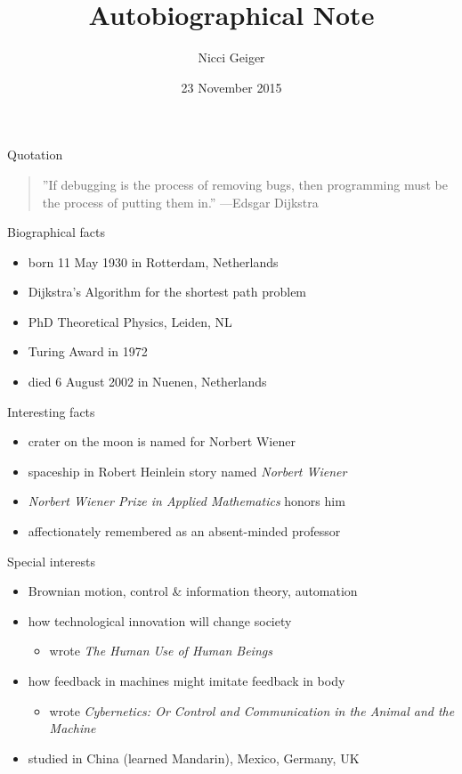 \documentclass{beamer}
\title{Autobiographical Note}
\author{Nicci Geiger}
\institute{Cornell College}
\date{23 November 2015}
\begin{document}
\begin{frame}
  \titlepage
\end{frame}

\begin{frame}{Quotation}
\begin{quotation}
\noindent
''If debugging is the process of removing bugs, then programming must be the process of putting them in.''
  \flushright
  ---Edsgar Dijkstra
  \end{quotation}
\end{frame}

\begin{frame}{Biographical facts}
\begin{itemize}
  \item born 11 May 1930 in Rotterdam, Netherlands
  \item Dijkstra's Algorithm for the shortest path problem
  \item PhD Theoretical Physics, Leiden, NL
  \item Turing Award in 1972
  \item died 6 August 2002 in Nuenen, Netherlands
  \end{itemize}
\end{frame}

\begin{frame}{Interesting facts}
\begin{itemize}
  \item crater on the moon is named for Norbert Wiener
  \item spaceship in Robert Heinlein story
    named \emph{Norbert Wiener}
  \item \emph{Norbert Wiener Prize in Applied Mathematics} honors him
  \item affectionately remembered as an absent-minded professor
  \end{itemize}
\end{frame}

\begin{frame}{Special interests}
\begin{itemize}
  \item Brownian motion, control \& information theory,
    automation
  \item how technological innovation will
    change society 
  \begin{itemize}
    \item wrote \emph{The Human Use of Human Beings}
    \end{itemize}
  \item how feedback in machines might imitate feedback in body
  \begin{itemize}
    \item wrote \emph{Cybernetics: Or Control
      and Communication in the Animal and the Machine}
    \end{itemize}
  \item studied in China (learned Mandarin), Mexico, Germany, UK
  \end{itemize}
\end{frame}
\end{document}
